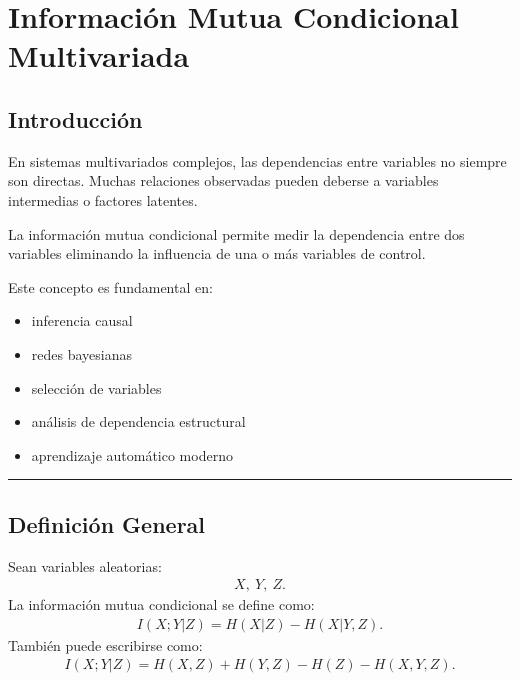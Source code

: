 \documentclass[letterpaper,10pt,english]{jupyterBook}
\begin{document}
\sphinxstepscope


\chapter{Información Mutua Condicional Multivariada}
\label{\detokenize{03_multivariate_models/conditional_mi:informacion-mutua-condicional-multivariada}}\label{\detokenize{03_multivariate_models/conditional_mi::doc}}

\section{Introducción}
\label{\detokenize{03_multivariate_models/conditional_mi:introduccion}}
\sphinxAtStartPar
En sistemas multivariados complejos, las dependencias entre variables
no siempre son directas. Muchas relaciones observadas pueden deberse
a variables intermedias o factores latentes.

\sphinxAtStartPar
La información mutua condicional permite medir la dependencia entre
dos variables eliminando la influencia de una o más variables de control.

\sphinxAtStartPar
Este concepto es fundamental en:
\begin{itemize}
\item {} 
\sphinxAtStartPar
inferencia causal

\item {} 
\sphinxAtStartPar
redes bayesianas

\item {} 
\sphinxAtStartPar
selección de variables

\item {} 
\sphinxAtStartPar
análisis de dependencia estructural

\item {} 
\sphinxAtStartPar
aprendizaje automático moderno

\end{itemize}


\bigskip\hrule\bigskip



\section{Definición General}
\label{\detokenize{03_multivariate_models/conditional_mi:definicion-general}}
\sphinxAtStartPar
Sean variables aleatorias:
\begin{equation*}
\begin{split}
X,\ Y,\ Z.
\end{split}
\end{equation*}
\sphinxAtStartPar
La información mutua condicional se define como:
\begin{equation*}
\begin{split}
I(X;Y|Z)
=
H(X|Z)
-
H(X|Y,Z).
\end{split}
\end{equation*}
\sphinxAtStartPar
También puede escribirse como:
\begin{equation*}
\begin{split}
I(X;Y|Z)
=
H(X,Z)
+
H(Y,Z)
-
H(Z)
-
H(X,Y,Z).
\end{split}
\end{equation*}
\end{document}
